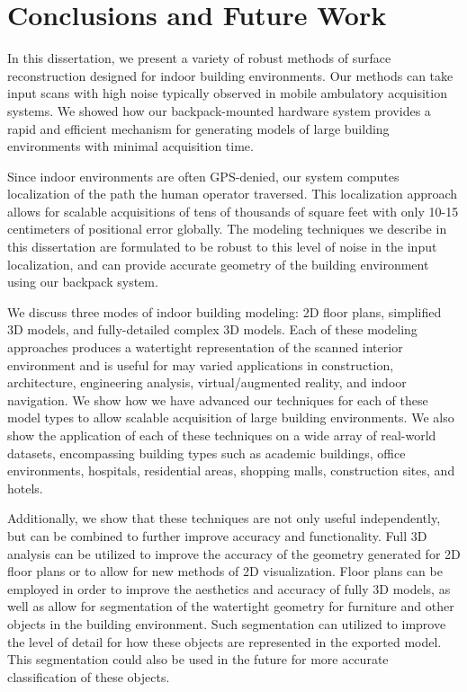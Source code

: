 \documentclass[12pt,onecolumn,oneside]{book}
\begin{document}
\chapter{Conclusions and Future Work}
\label{ch:conclusion}

In this dissertation, we present a variety of robust methods of surface reconstruction designed for indoor building environments.  Our methods can take input scans with high noise typically observed in mobile ambulatory acquisition systems.  We showed how our backpack-mounted hardware system provides a rapid and efficient mechanism for generating models of large building environments with minimal acquisition time.

Since indoor environments are often GPS-denied, our system computes localization of the path the human operator traversed.  This localization approach allows for scalable acquisitions of tens of thousands of square feet with only 10-15 centimeters of positional error globally.  The modeling techniques we describe in this dissertation are formulated to be robust to this level of noise in the input localization, and can provide accurate geometry of the building environment using our backpack system.

We discuss three modes of indoor building modeling:  2D floor plans, simplified 3D models, and fully-detailed complex 3D models.  Each of these modeling approaches produces a watertight representation of the scanned interior environment and is useful for may varied applications in construction, architecture, engineering analysis, virtual/augmented reality, and indoor navigation.  We show how we have advanced our techniques for each of these model types to allow scalable acquisition of large building environments.  We also show the application of each of these techniques on a wide array of real-world datasets, encompassing building types such as academic buildings, office environments, hospitals, residential areas, shopping malls, construction sites, and hotels.

Additionally, we show that these techniques are not only useful independently, but can be combined to further improve accuracy and functionality.  Full 3D analysis can be utilized to improve the accuracy of the geometry generated for 2D floor plans or to allow for new methods of 2D visualization.  Floor plans can be employed in order to improve the aesthetics and accuracy of fully 3D models, as well as allow for segmentation of the watertight geometry for furniture and other objects in the building environment.  Such segmentation can utilized to improve the level of detail for how these objects are represented in the exported model.  This segmentation could also be used in the future for more accurate classification of these objects.  
\end{document}
